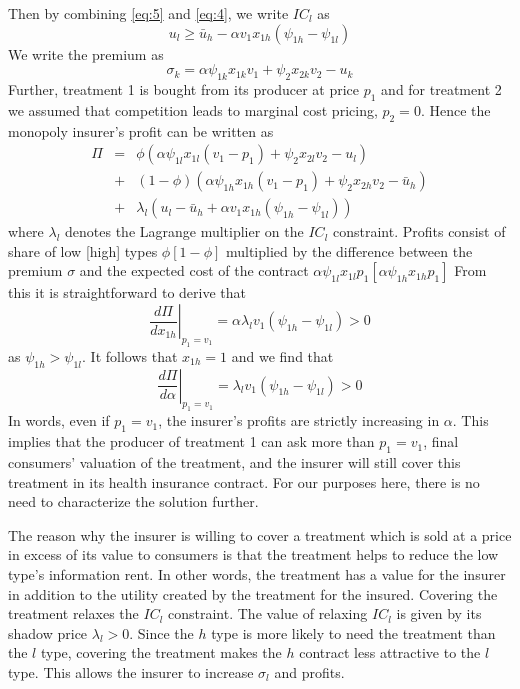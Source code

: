 \documentclass[12pt,english,a4paper]{article}
\begin{document}
Then by combining \eqref{eq:5} and \eqref{eq:4}, we write \(IC_l\) as
\begin{equation}
\label{eq:6}
u_l \geq \bar u_h - \alpha v_1 x_{1h} (\psi_{1h}-\psi_{1l})
\end{equation}
We write the premium as
\begin{equation}
\label{eq:7}
\sigma_k = \alpha \psi_{1k} x_{1k} v_1 + \psi_2 x_{2k} v_2 - u_k
\end{equation}
Further, treatment 1 is bought from its producer at price \(p_1\) and for treatment 2 we assumed that competition leads to marginal cost pricing, \(p_2=0\). Hence the monopoly insurer's profit can be written as
\begin{eqnarray}
\label{eq:8}
\Pi &=& \phi (\alpha \psi_{1l}x_{1l}(v_1-p_1)+\psi_2 x_{2l}v_2 - u_l) \\
\nonumber
    &+& (1-\phi) (\alpha \psi_{1h} x_{1h}(v_1-p_1) + \psi_2 x_{2h} v_2 - \bar u_h) \\
\nonumber
 &+& \lambda_l(u_l - \bar u_h + \alpha v_1 x_{1h}(\psi_{1h}-\psi_{1l}))
\end{eqnarray}
where \(\lambda_l\) denotes the Lagrange multiplier on the \(IC_l\) constraint. Profits consist of share of low [high] types \(\phi [1-\phi]\) multiplied by the difference between the premium \(\sigma\) and the expected cost of the contract \(\alpha \psi_{1l} x_{1l} p_1 [\alpha \psi_{1h} x_{1h} p_1 ]\) From this it is straightforward to derive that
\begin{equation}
\label{eq:9}
\left. \frac{d\Pi}{dx_{1h}} \right|_{p_1=v_1} = \alpha \lambda_l v_1 (\psi_{1h}-\psi_{1l}) > 0
\end{equation}
as \(\psi_{1h}>\psi_{1l}\). It follows that \(x_{1h} =1\) and we find that
\begin{equation}
\label{eq:10}
\left. \frac{d\Pi}{d \alpha} \right|_{p_1=v_1} = \lambda_l v_1 (\psi_{1h}-\psi_{1l}) > 0
\end{equation}
In words, even if \(p_1=v_1\), the insurer's profits are strictly increasing in \(\alpha\). This implies that the producer of treatment 1 can ask more than \(p_1 = v_1\), final consumers' valuation of the treatment, and the insurer will still cover this treatment in its health insurance contract. For our purposes here, there is no need to characterize the solution further.

The reason why the insurer is willing to cover a treatment which is sold at a price in excess of its value to consumers is that the treatment helps to reduce the low type's information rent. In other words, the treatment has a value for the insurer in addition to the utility created by the treatment for the insured. Covering the treatment relaxes the \(IC_l\) constraint. The value of relaxing \(IC_l\) is given by its shadow price \(\lambda_l > 0\). Since the \(h\) type is more likely to need the treatment than the \(l\) type, covering the treatment makes the \(h\) contract less attractive to the \(l\) type. This allows the insurer to increase \(\sigma_l\) and profits.
\end{document}
